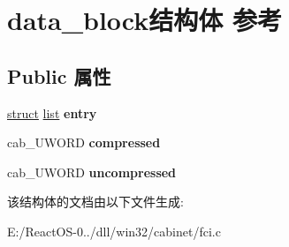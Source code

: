 \hypertarget{structdata__block}{}\section{data\+\_\+block结构体 参考}
\label{structdata__block}
\subsection*{Public 属性}
\begin{DoxyCompactItemize}
\item 
\mbox{\label{structdata__block_ac7db7e066ed1ce0df64e840c8234be88}} 
\hyperlink{interfacestruct}{struct} \hyperlink{classlist}{list} {\bfseries entry}
\item 
\mbox{\label{structdata__block_a14bc752a714ea065f40192f473587a66}} 
cab\+\_\+\+U\+W\+O\+RD {\bfseries compressed}
\item 
\mbox{\label{structdata__block_a77a9906b04abdb4c083ae7288c9a9212}} 
cab\+\_\+\+U\+W\+O\+RD {\bfseries uncompressed}
\end{DoxyCompactItemize}


该结构体的文档由以下文件生成\+:\begin{DoxyCompactItemize}
\item 
E\+:/\+React\+O\+S-\/0../dll/win32/cabinet/fci.\+c\end{DoxyCompactItemize}
